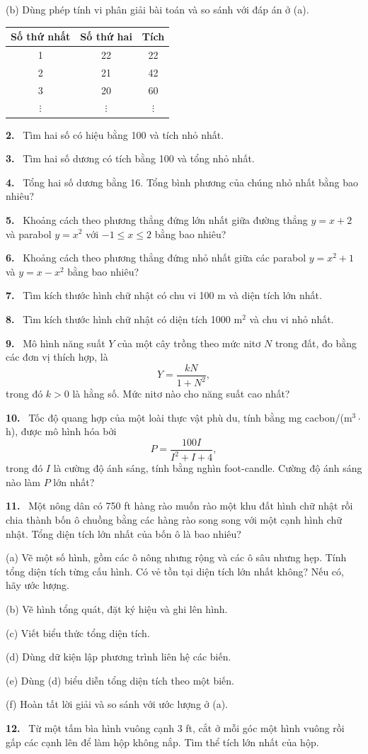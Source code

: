 \documentclass[12pt,a4paper]{article}
\newcommand{\bt}[1]{\par\smallskip\Needspace{5\baselineskip}\noindent\textbf{#1.}\ }
\begin{document}
(b) Dùng phép tính vi phân giải bài toán và so sánh với đáp án ở (a).
\begin{center}\begin{tabular}{ccc}\toprule
Số thứ nhất&Số thứ hai&Tích\\\midrule
1&22&22\\2&21&42\\3&20&60\\$\vdots$&$\vdots$&$\vdots$\\\bottomrule
\end{tabular}\end{center}
\bt{2} Tìm hai số có hiệu bằng 100 và tích nhỏ nhất.
\bt{3} Tìm hai số dương có tích bằng 100 và tổng nhỏ nhất.
\bt{4} Tổng hai số dương bằng 16. Tổng bình phương của chúng nhỏ nhất bằng bao nhiêu?
\bt{5} Khoảng cách theo phương thẳng đứng lớn nhất giữa đường thẳng $y=x+2$ và parabol $y=x^2$ với $-1\le x\le2$ bằng bao nhiêu?
\bt{6} Khoảng cách theo phương thẳng đứng nhỏ nhất giữa các parabol $y=x^2+1$ và $y=x-x^2$ bằng bao nhiêu?
\bt{7} Tìm kích thước hình chữ nhật có chu vi 100 m và diện tích lớn nhất.
\bt{8} Tìm kích thước hình chữ nhật có diện tích 1000 m$^2$ và chu vi nhỏ nhất.
\bt{9} Mô hình năng suất $Y$ của một cây trồng theo mức nitơ $N$ trong đất, đo bằng các đơn vị thích hợp, là
\[Y=\frac{kN}{1+N^2},\]
trong đó $k>0$ là hằng số. Mức nitơ nào cho năng suất cao nhất?
\bt{10} Tốc độ quang hợp của một loài thực vật phù du, tính bằng mg cacbon/(m$^3\cdot$h), được mô hình hóa bởi
\[P=\frac{100I}{I^2+I+4},\]
trong đó $I$ là cường độ ánh sáng, tính bằng nghìn foot-candle. Cường độ ánh sáng nào làm $P$ lớn nhất?
\bt{11} Một nông dân có 750 ft hàng rào muốn rào một khu đất hình chữ nhật rồi chia thành bốn ô chuồng bằng các hàng rào song song với một cạnh hình chữ nhật. Tổng diện tích lớn nhất của bốn ô là bao nhiêu?

(a) Vẽ một số hình, gồm các ô nông nhưng rộng và các ô sâu nhưng hẹp. Tính tổng diện tích từng cấu hình. Có vẻ tồn tại diện tích lớn nhất không? Nếu có, hãy ước lượng.

(b) Vẽ hình tổng quát, đặt ký hiệu và ghi lên hình.

(c) Viết biểu thức tổng diện tích.

(d) Dùng dữ kiện lập phương trình liên hệ các biến.

(e) Dùng (d) biểu diễn tổng diện tích theo một biến.

(f) Hoàn tất lời giải và so sánh với ước lượng ở (a).
\bt{12} Từ một tấm bìa hình vuông cạnh 3 ft, cắt ở mỗi góc một hình vuông rồi gấp các cạnh lên để làm hộp không nắp. Tìm thể tích lớn nhất của hộp.
\end{document}
